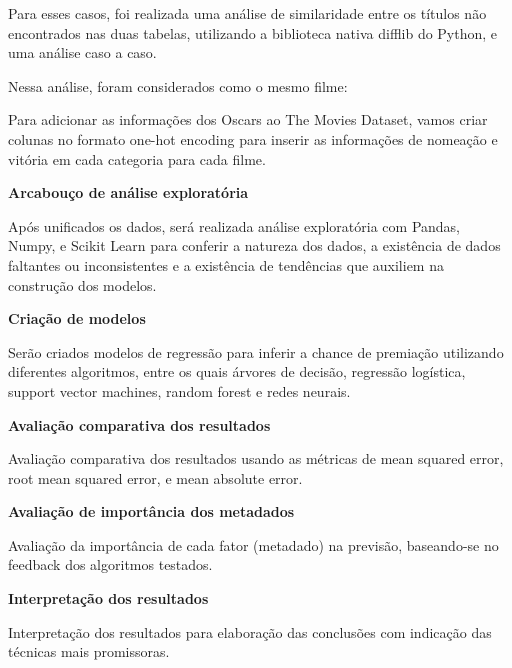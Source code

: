             Para esses casos, foi realizada uma análise de similaridade entre os títulos não encontrados nas duas tabelas, utilizando a biblioteca nativa difflib do Python, e uma análise caso a caso.
            
            Nessa análise, foram considerados como o mesmo filme:\newline
            
            
            
            
            
            
            
            
            Para adicionar as informações dos Oscars ao The Movies Dataset, vamos criar colunas no formato one-hot encoding para inserir as informações de nomeação e vitória em cada categoria para cada filme.\newline
            
            
            
            
            \textbf{Arcabouço de análise exploratória}\par
            Após unificados os dados, será realizada análise exploratória com Pandas, Numpy, e Scikit Learn para conferir a natureza dos dados, a existência de dados faltantes ou inconsistentes e a existência de tendências que auxiliem na construção dos modelos.\newline
    
            \textbf{Criação de modelos}\par
            Serão criados modelos de regressão para inferir a chance de premiação utilizando diferentes algoritmos, entre os quais árvores de decisão, regressão logística, support vector machines, random forest e redes neurais.\newline
    
            \textbf{Avaliação comparativa dos resultados}\par
            Avaliação comparativa dos resultados usando as métricas de mean squared error, root mean squared error, e mean absolute error.\newline
    
            \textbf{Avaliação de importância dos metadados}\par
            Avaliação da importância de cada fator (metadado) na previsão, baseando-se no feedback dos algoritmos testados.\newline
    
            \textbf{Interpretação dos resultados}\par
            Interpretação dos resultados para elaboração das conclusões com indicação das técnicas mais promissoras.\newline

